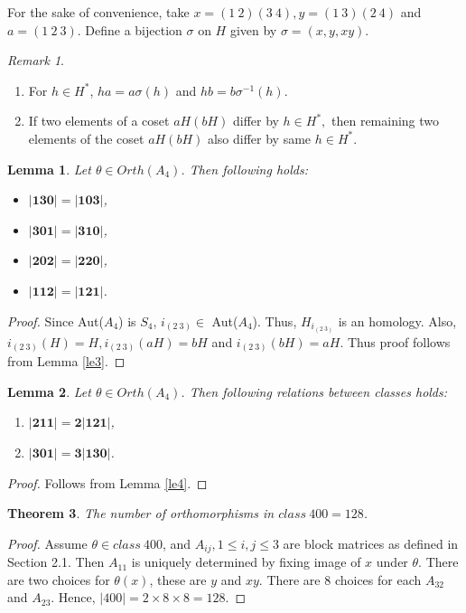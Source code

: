 \documentclass[11pt,a4paper]{article}
\newtheorem{theorem}{Theorem}[section]
\newtheorem{lemma}[theorem]{Lemma}
\theoremstyle{definition}
\theoremstyle{remark}
\newtheorem{remark}{Remark}
\begin{document}
	For the sake of convenience, take $x = (1~2)(3~4), y = (1~3)(2~4)$ and $a = (1~2~3)$.  Define a bijection $\sigma$ on $H$ given by $\sigma = (x,y,xy)$.
	\begin{remark}\label{re4}\hfill
		\begin{enumerate}
			\item [(a)] For $h \in H^{\ast}$, $ha = a\sigma(h)$ and $hb = b\sigma^{-1}(h).$
			\item [(b)] If two elements of a coset $aH (bH)$ differ by $h \in H^{\ast},$ then remaining two elements of the coset $aH(bH)$ also differ by same $h \in H^{\ast}.$
		\end{enumerate}
	\end{remark}
	
	\begin{lemma}\label{le6} Let $\theta \in Orth(A_{4})$. Then following holds: 
		\begin{itemize}
			\item [(i)] $\bm{\vert 130 \vert = \vert 103\vert}$,	
			\item [(ii)] $\bm{\vert 301 \vert = \vert 310\vert}$,
			\item [(iii)] $\bm{\vert 202 \vert = \vert 220\vert}$,
			\item [(iv)] $\bm{\vert 112 \vert = \vert 121\vert}$.	
		\end{itemize}
	\end{lemma}
	\begin{proof}
	 Since Aut($A_4$) is $S_4$, $i_{(2~3)} \in$ Aut($A_4$). Thus, $H_{i_{(2~3)}}$ is an homology. Also, $i_{(2~3)}(H) = H, i_{(2~3)}(aH) = bH$ and $i_{(2~3)}(bH) = aH$.  Thus proof follows from  Lemma \ref{le3}.
	\end{proof}

		
\begin{lemma} \label{le7}
	Let $\theta \in Orth(A_{4})$. Then following relations between classes holds:
		\begin{enumerate} 
		\item[(i)] 	$\bm{\vert 211 \vert = 2\vert 121 \vert}$,
		\item[(ii)] 	$\bm{\vert 301 \vert = 3\vert 130 \vert}$.
	\end{enumerate}
\end{lemma}
\begin{proof}
		Follows from Lemma \ref{le4}.
\end{proof}

		\begin{theorem}\label{th1}
	The number of orthomorphisms in	$class~400 = 128$.
	\end{theorem}
	\begin{proof}
		Assume $\theta \in class~400$, and $A_{ij}, 1 \leq i,j \leq 3$ are block matrices as defined in Section 2.1. Then $A_{11}$ is uniquely determined by fixing image of $x$ under $\theta$. There are two choices for $\theta(x)$, these are $y$ and $xy$. There are 8 choices for each $A_{32}$ and $A_{23}$. Hence, $|400| = 2 \times 8 \times 8 = 128.$ 
	\end{proof}
\end{document}
